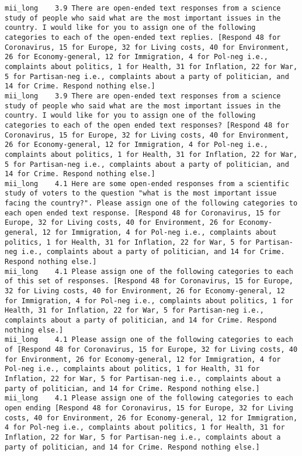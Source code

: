 \begin{lstlisting}[label=lst:promptvariants]
mii_long	3.9	There are open-ended text responses from a science study of people who said what are the most important issues in the country. I would like for you to assign one of the following categories to each of the open-ended text replies. [Respond 48 for Coronavirus, 15 for Europe, 32 for Living costs, 40 for Environment, 26 for Economy-general, 12 for Immigration, 4 for Pol-neg i.e., complaints about politics, 1 for Health, 31 for Inflation, 22 for War, 5 for Partisan-neg i.e., complaints about a party of politician, and 14 for Crime. Respond nothing else.]
mii_long	3.9	There are open-ended text responses from a science study of people who said what are the most important issues in the country. I would like for you to assign one of the following categories to each of the open ended text responses? [Respond 48 for Coronavirus, 15 for Europe, 32 for Living costs, 40 for Environment, 26 for Economy-general, 12 for Immigration, 4 for Pol-neg i.e., complaints about politics, 1 for Health, 31 for Inflation, 22 for War, 5 for Partisan-neg i.e., complaints about a party of politician, and 14 for Crime. Respond nothing else.]
mii_long	4.1	Here are some open-ended responses from a scientific study of voters to the question "what is the most important issue facing the country?". Please assign one of the following categories to each open ended text response. [Respond 48 for Coronavirus, 15 for Europe, 32 for Living costs, 40 for Environment, 26 for Economy-general, 12 for Immigration, 4 for Pol-neg i.e., complaints about politics, 1 for Health, 31 for Inflation, 22 for War, 5 for Partisan-neg i.e., complaints about a party of politician, and 14 for Crime. Respond nothing else.]
mii_long	4.1	Please assign one of the following categories to each of this set of responses. [Respond 48 for Coronavirus, 15 for Europe, 32 for Living costs, 40 for Environment, 26 for Economy-general, 12 for Immigration, 4 for Pol-neg i.e., complaints about politics, 1 for Health, 31 for Inflation, 22 for War, 5 for Partisan-neg i.e., complaints about a party of politician, and 14 for Crime. Respond nothing else.]
mii_long	4.1	Please assign one of the following categories to each of [Respond 48 for Coronavirus, 15 for Europe, 32 for Living costs, 40 for Environment, 26 for Economy-general, 12 for Immigration, 4 for Pol-neg i.e., complaints about politics, 1 for Health, 31 for Inflation, 22 for War, 5 for Partisan-neg i.e., complaints about a party of politician, and 14 for Crime. Respond nothing else.]
mii_long	4.1	Please assign one of the following categories to each open ending [Respond 48 for Coronavirus, 15 for Europe, 32 for Living costs, 40 for Environment, 26 for Economy-general, 12 for Immigration, 4 for Pol-neg i.e., complaints about politics, 1 for Health, 31 for Inflation, 22 for War, 5 for Partisan-neg i.e., complaints about a party of politician, and 14 for Crime. Respond nothing else.]

\end{lstlisting}
